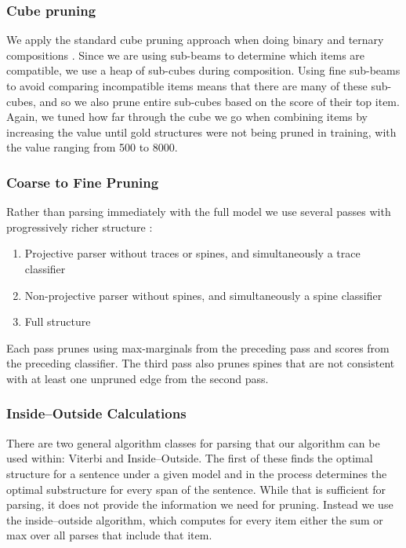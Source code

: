 \subsubsection{Cube pruning}

We apply the standard cube pruning approach when doing binary and ternary compositions \parencite{Chiang:2007}.
Since we are using sub-beams to determine which items are compatible, we use a heap of sub-cubes during composition.
Using fine sub-beams to avoid comparing incompatible items means that there are many of these sub-cubes, and so we also prune entire sub-cubes based on the score of their top item.
Again, we tuned how far through the cube we go when combining items by increasing the value until gold structures were not being pruned in training, with the value ranging from 500 to 8000.

\subsubsection{Coarse to Fine Pruning}

Rather than parsing immediately with the full model we use several passes with progressively richer structure \parencite{Goodman:1997}:

\begin{enumerate}
  \item Projective parser without traces or spines, and simultaneously a trace classifier
  \item Non-projective parser without spines, and simultaneously a spine classifier
  \item Full structure
\end{enumerate}

Each pass prunes using max-marginals from the preceding pass and scores from the preceding classifier.
The third pass also prunes spines that are not consistent with at least one unpruned edge from the second pass.

\subsubsection{Inside--Outside Calculations}

There are two general algorithm classes for parsing that our algorithm can be used within: Viterbi and Inside--Outside.
The first of these finds the optimal structure for a sentence under a given model and in the process determines the optimal substructure for every span of the sentence.
While that is sufficient for parsing, it does not provide the information we need for pruning.
Instead we use the inside--outside algorithm, which computes for every item either the sum or max over all parses that include that item.


